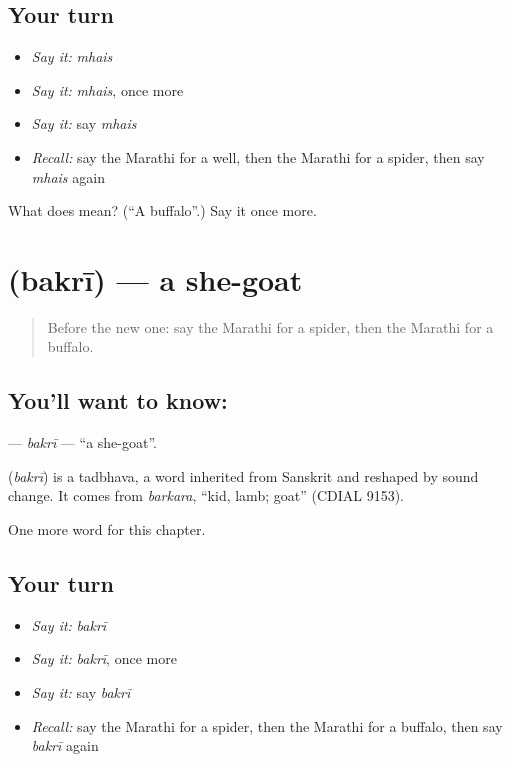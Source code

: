 \subsection*{Your turn}
\begin{itemize}
\raggedright
  \item \emph{Say it:} \emph{mhais}
  \item \emph{Say it:} \emph{mhais}, once more
  \item \emph{Say it:} say \emph{mhais}
  \item \emph{Recall:} say the Marathi for a well, then the Marathi for a spider, then say \emph{mhais} again
\end{itemize}

\begin{tcolorbox}[breakable,colback=teal!4,colframe=teal!35!black,title={Before you move on}]
What does  mean? (\textquotedblleft{}A buffalo\textquotedblright{}.) Say it once more.
\end{tcolorbox}
\section[\texorpdfstring{\mr{बकरी} (bakrī)}{बकरी (bakrī)}]{ (bakrī) — a she-goat}

\label{lesson:MR-C218-bakri}



\begin{quote}
Before the new one: say the Marathi for a spider, then the Marathi for a buffalo.
\end{quote}

\subsection*{You'll want to know: }
\textbf{} — \emph{bakrī} — \textquotedblleft{}a she-goat\textquotedblright{}.

\begin{cousinweb}
\textbf{} (\emph{bakrī}) is a tadbhava, a word inherited from Sanskrit and reshaped by sound change. It comes from \emph{barkara}, \textquotedblleft{}kid, lamb; goat\textquotedblright{} (CDIAL 9153).
\end{cousinweb}

\begin{grammarlens}[title={What you've built}]
One more word for this chapter.
\end{grammarlens}

\subsection*{Your turn}
\begin{itemize}
\raggedright
  \item \emph{Say it:} \emph{bakrī}
  \item \emph{Say it:} \emph{bakrī}, once more
  \item \emph{Say it:} say \emph{bakrī}
  \item \emph{Recall:} say the Marathi for a spider, then the Marathi for a buffalo, then say \emph{bakrī} again
\end{itemize}

